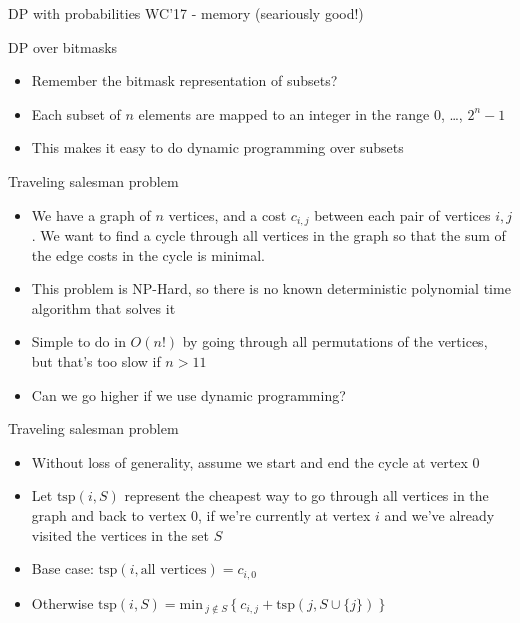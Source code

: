 \documentclass[12pt,t]{beamer}
\newcommand{\bi}{\begin{itemize}}
\newcommand{\ei}{\end{itemize}}
\begin{document}
\begin{frame}{DP with probabilities}
	WC'17 - memory (seariously good!)
\end{frame}


\begin{frame}{DP over bitmasks}
    \vspace{40pt}
    \bi
        \item Remember the bitmask representation of subsets?
        \item Each subset of $n$ elements are mapped to an integer in the range $0$, \ldots, $2^{n} - 1$
        \item This makes it easy to do dynamic programming over subsets
    \ei
\end{frame}

\begin{frame}{Traveling salesman problem}
    \vspace{10pt}

    \bi
        \item We have a graph of $n$ vertices, and a cost $c_{i,j}$ between each pair of vertices $i, j$. We want to find a cycle through all vertices in the graph so that the sum of the edge costs in the cycle is minimal.

        \vspace{5pt}
        \item This problem is NP-Hard, so there is no known deterministic polynomial time algorithm that solves it

        \vspace{10pt}
        \item Simple to do in $O(n!)$ by going through all permutations of the vertices, but that's too slow if $n > 11$

        \vspace{10pt}
        \item Can we go higher if we use dynamic programming?
    \ei
\end{frame}

\begin{frame}{Traveling salesman problem}
    \vspace{20pt}
    \bi
\item Without loss of generality, assume we start and end the cycle at vertex $0$
    \vspace{10pt}

\item Let $\mathrm{tsp}(i, S)$ represent the cheapest way to go through all vertices in the graph and back to vertex $0$, if we're currently at vertex $i$ and we've already visited the vertices in the set $S$

    \vspace{20pt}
\item Base case: $\mathrm{tsp}(i, \textrm{all vertices}) = c_{i,0}$
\item Otherwise $\mathrm{tsp}(i, S) = \mathrm{min}_{\ j \not\in S\ } \{\ c_{i,j} + \mathrm{tsp}(j, S \cup \{j\})\ \}$
    \ei
\end{frame}
\end{document}
